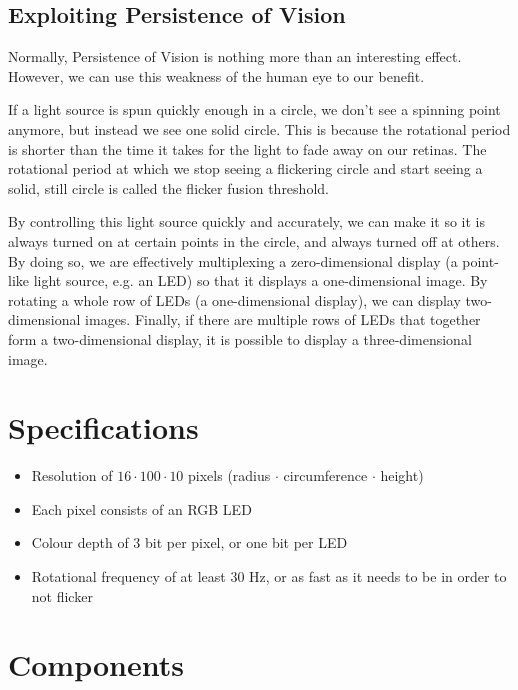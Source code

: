 \documentclass[a4paper, 11pt, titlepage]{report}
\begin{document}
\subsection{Exploiting Persistence of Vision}

Normally, Persistence of Vision is nothing more than an interesting effect. However, we can
use this weakness of the human eye to our benefit.

If a light source is spun quickly enough in a circle, we don't see a spinning
point anymore, but instead we see one solid circle. This is because the rotational period is
shorter than the time it takes for the light to fade away on our retinas. The rotational period
at which we stop seeing a flickering circle and start seeing a solid, still circle is called
the flicker fusion threshold.

By controlling this light source quickly and accurately, we can make it so it is always turned
on at certain points in the circle, and always turned off at others. By doing so, we are
effectively multiplexing a zero-dimensional display (a point-like light source, e.g. an LED)
so that it displays a one-dimensional image. By rotating a whole row of LEDs (a one-dimensional
display), we can display two-dimensional images. Finally, if there are multiple rows of LEDs
that together form a two-dimensional display, it is possible to display a three-dimensional
image.


\section{Specifications}

\begin{itemize}

\item Resolution of $16 \cdot 100 \cdot 10$ pixels (radius $\cdot$ circumference $\cdot$ height)
\item Each pixel consists of an RGB LED
\item Colour depth of 3 bit per pixel, or one bit per LED
\item Rotational frequency of at least 30 Hz, or as fast as it needs to be in order to not flicker

\end{itemize}




\section{Components}
\end{document}
